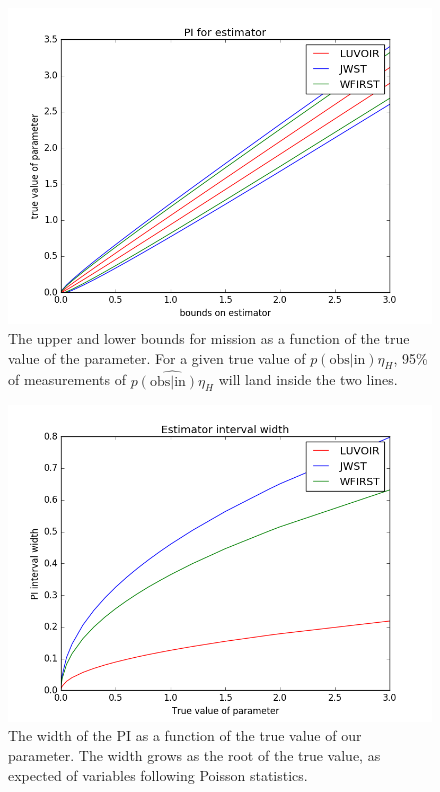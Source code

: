 \documentclass{article}
\begin{document}
	\begin{figure}
		\includegraphics[width = \linewidth]{PI_eta.png}
		\caption{The upper and lower bounds for mission as a function of the true value of the parameter. For a given true value of $p(\mbox{obs}|\mbox{in}) \eta_H$, 95\% of measurements of $\widehat{p(\mbox{obs}|\mbox{in}) \eta_H}$ will land inside the two lines.}
		\label{fig:PI_}
	\end{figure}
	
	\begin{figure}
		\includegraphics[width = \linewidth]{PI_width_eta.png}
		\caption{The width of the PI as a function of the true value of our parameter. The width grows as the root of the true value, as expected of variables following Poisson statistics.}
		\label{fig:width}
	\end{figure}
	
\end{document}
